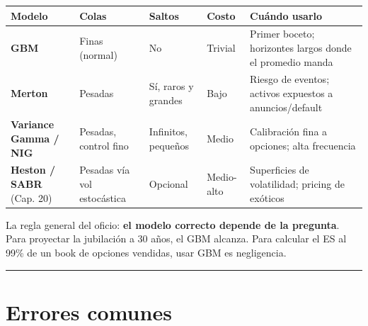 \documentclass[
  spanish,
  letterpaper,
  DIV=11,
  numbers=noendperiod]{scrreprt}
\begin{document}
\begin{longtable}[]{@{}
  >{\raggedright\arraybackslash}p{}
  >{\raggedright\arraybackslash}p{}
  >{\raggedright\arraybackslash}p{}
  >{\raggedright\arraybackslash}p{}
  >{\raggedright\arraybackslash}p{}@{}}
\toprule\noalign{}
\begin{minipage}[b]{\linewidth}\raggedright
Modelo
\end{minipage} & \begin{minipage}[b]{\linewidth}\raggedright
Colas
\end{minipage} & \begin{minipage}[b]{\linewidth}\raggedright
Saltos
\end{minipage} & \begin{minipage}[b]{\linewidth}\raggedright
Costo
\end{minipage} & \begin{minipage}[b]{\linewidth}\raggedright
Cuándo usarlo
\end{minipage} \\
\midrule\noalign{}
\endhead
\bottomrule\noalign{}
\endlastfoot
\textbf{GBM} & Finas (normal) & No & Trivial & Primer boceto; horizontes
largos donde el promedio manda \\
\textbf{Merton} & Pesadas & Sí, raros y grandes & Bajo & Riesgo de
eventos; activos expuestos a anuncios/default \\
\textbf{Variance Gamma / NIG} & Pesadas, control fino & Infinitos,
pequeños & Medio & Calibración fina a opciones; alta frecuencia \\
\textbf{Heston / SABR} (Cap. 20) & Pesadas vía vol estocástica &
Opcional & Medio-alto & Superficies de volatilidad; pricing de
exóticos \\
\end{longtable}

La regla general del oficio: \textbf{el modelo correcto depende de la
pregunta}. Para proyectar la jubilación a 30 años, el GBM alcanza. Para
calcular el ES al 99\% de un book de opciones vendidas, usar GBM es
negligencia.

\begin{center}\rule{0.5\linewidth}{0.5pt}\end{center}

\chapter{Errores comunes}\label{errores-comunes-12}
\end{document}
